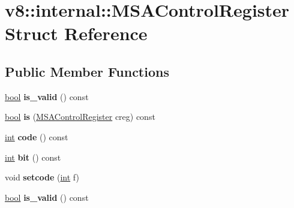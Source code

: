 \hypertarget{structv8_1_1internal_1_1MSAControlRegister}{}\section{v8\+:\+:internal\+:\+:M\+S\+A\+Control\+Register Struct Reference}
\label{structv8_1_1internal_1_1MSAControlRegister}
\subsection*{Public Member Functions}
\begin{DoxyCompactItemize}
\item 
\mbox{\label{structv8_1_1internal_1_1MSAControlRegister_af936870a71ded63276f54dcd83351793}} 
\mbox{\hyperlink{classbool}{bool}} {\bfseries is\+\_\+valid} () const
\item 
\mbox{\label{structv8_1_1internal_1_1MSAControlRegister_a335f6f82f57cf0509223ebff7e91d39b}} 
\mbox{\hyperlink{classbool}{bool}} {\bfseries is} (\mbox{\hyperlink{structv8_1_1internal_1_1MSAControlRegister}{M\+S\+A\+Control\+Register}} creg) const
\item 
\mbox{\label{structv8_1_1internal_1_1MSAControlRegister_a34516d099bfb2cee951f8e2d6454cd55}} 
\mbox{\hyperlink{classint}{int}} {\bfseries code} () const
\item 
\mbox{\label{structv8_1_1internal_1_1MSAControlRegister_acbaf5d74707716b0f043e9634176e4e4}} 
\mbox{\hyperlink{classint}{int}} {\bfseries bit} () const
\item 
\mbox{\label{structv8_1_1internal_1_1MSAControlRegister_a3eb7e8de9042dc9d4389a017a0578efb}} 
void {\bfseries setcode} (\mbox{\hyperlink{classint}{int}} f)
\item 
\mbox{\label{structv8_1_1internal_1_1MSAControlRegister_af936870a71ded63276f54dcd83351793}} 
\mbox{\hyperlink{classbool}{bool}} {\bfseries is\+\_\+valid} () const
\item 

\end{DoxyCompactItemize}
